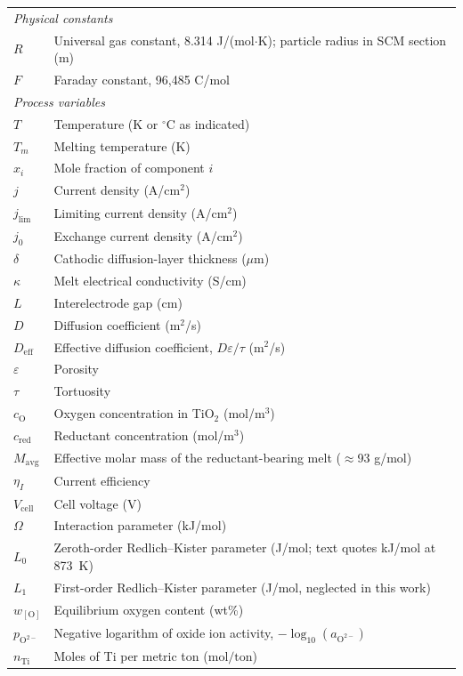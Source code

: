 \documentclass[11pt]{article}
\begin{document}
\begin{singlespace}
\begin{tabular}{ll}
\multicolumn{2}{l}{\textit{Physical constants}} \\
$R$ & Universal gas constant, 8.314 J/(mol$\cdot$K); particle radius in SCM section (m) \\
$F$ & Faraday constant, 96{,}485 C/mol \\
\multicolumn{2}{l}{\textit{Process variables}} \\
$T$ & Temperature (K or $^{\circ}$C as indicated) \\
$T_m$ & Melting temperature (K) \\
$x_i$ & Mole fraction of component $i$ \\
$j$ & Current density (A/cm$^2$) \\
$j_{\mathrm{lim}}$ & Limiting current density (A/cm$^2$) \\
$j_0$ & Exchange current density (A/cm$^2$) \\
$\delta$ & Cathodic diffusion-layer thickness ($\mu$m) \\
$\kappa$ & Melt electrical conductivity (S/cm) \\
$L$ & Interelectrode gap (cm) \\
$D$ & Diffusion coefficient (m$^2$/s) \\
$D_{\mathrm{eff}}$ & Effective diffusion coefficient, $D\varepsilon/\tau$ (m$^2$/s) \\
$\varepsilon$ & Porosity \\
$\tau$ & Tortuosity \\
$c_{\mathrm{O}}$ & Oxygen concentration in TiO$_2$ (mol/m$^3$) \\
$c_{\mathrm{red}}$ & Reductant concentration (mol/m$^3$) \\
$M_{\mathrm{avg}}$ & Effective molar mass of the reductant-bearing melt ($\approx$93 g/mol) \\
$\eta_I$ & Current efficiency \\
$V_{\mathrm{cell}}$ & Cell voltage (V) \\
$\Omega$ & Interaction parameter (kJ/mol) \\
$L_0$ & Zeroth-order Redlich--Kister parameter (J/mol; text quotes kJ/mol at 873~K) \\
$L_1$ & First-order Redlich--Kister parameter (J/mol, neglected in this work) \\
$w_{[\mathrm{O}]}$ & Equilibrium oxygen content (wt\%) \\
$p_{\mathrm{O}^{2-}}$ & Negative logarithm of oxide ion activity, $-\log_{10}(a_{\mathrm{O}^{2-}})$ \\
$n_{\mathrm{Ti}}$ & Moles of Ti per metric ton ($\mathrm{mol/ton}$) \\
\end{tabular}
\end{singlespace}
\end{document}
